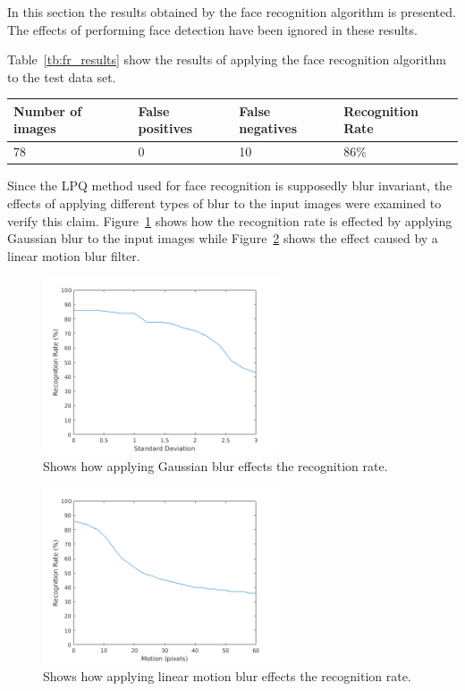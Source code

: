 In this section the results obtained by the face recognition algorithm is  presented. The effects of performing face detection have been ignored in these results.

Table~\ref{tb:fr_results} show the results of applying the face recognition algorithm to the test data set.

\begin{center}
  \label{tb:fr_results}
    \begin{tabular}{ | l | l | l | l |}
    \hline
    Number of images & False positives & False negatives & Recognition Rate \\ \hline
    78 & 0 & 10 & 86\% \\ \hline
    \end{tabular}
\end{center}

Since the LPQ method used for face recognition is supposedly blur invariant, the effects of applying different types of blur to the input images were examined to verify this claim. Figure~\ref{fig:fr_result_plots_gauss} shows how the recognition rate is effected by applying Gaussian blur to the input images while Figure~\ref{fig:fr_result_plots_motion} shows the effect caused by a linear motion blur filter.

\begin{figure}[H]
\centering
\includegraphics[width=0.62\textwidth]{img/blur_test/gauss_plot.png}
\caption{Shows how applying Gaussian blur effects the recognition rate.}
\label{fig:fr_result_plots_gauss}
\end{figure}

\begin{figure}[H]
\centering
\includegraphics[width=0.62\textwidth]{img/blur_test/motion_plot.png}
\caption{Shows how applying linear motion blur effects the recognition rate.}
\label{fig:fr_result_plots_motion}
\end{figure}

